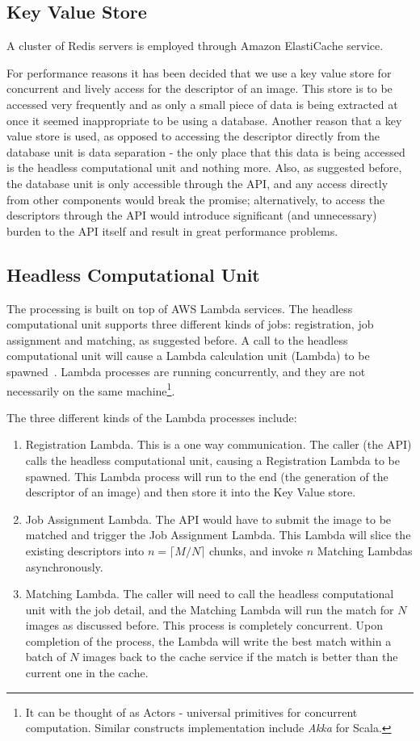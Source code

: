 \subsection{Key Value Store}
A cluster of Redis servers is employed through Amazon ElastiCache service.

For performance reasons it has been decided that we use a key value store for concurrent and lively access for the descriptor of an image. This store is to be accessed very frequently and as only a small piece of data is being extracted at once it seemed inappropriate to be using a database. Another reason that a key value store is used, as opposed to accessing the descriptor directly from the database unit is data separation - the only place that this data is being accessed is the headless computational unit and nothing more. Also, as suggested before, the database unit is only accessible through the API, and any access directly from other components would break the promise; alternatively, to access the descriptors through the API would introduce significant (and unnecessary) burden to the API itself and result in great performance problems.

\subsection{Headless Computational Unit}
\label{sec:lambda}
The processing is built on top of AWS Lambda services. The headless computational unit supports three different kinds of jobs: registration, job assignment and matching, as suggested before. A call to the headless computational unit will cause a Lambda calculation unit (Lambda) to be spawned~\cite{lambda}. Lambda processes are running concurrently, and they are not necessarily on the same machine\footnote{It can be thought of as Actors - universal primitives for concurrent computation. Similar constructs implementation include \textit{Akka} for Scala.}.

The three different kinds of the Lambda processes include:

\begin{enumerate}
	\item Registration Lambda. This is a one way communication. The caller (the API) calls the headless computational unit, causing a Registration Lambda to be spawned. This Lambda process will run to the end (the generation of the descriptor of an image) and then store it into the Key Value store.
	\item Job Assignment Lambda. The API would have to submit the image to be matched and trigger the Job Assignment Lambda. This Lambda will slice the existing descriptors into $n=\lceil M / N \rceil$ chunks, and invoke $n$ Matching Lambdas asynchronously.
	\item Matching Lambda. The caller will need to call the headless computational unit with the job detail, and the Matching Lambda will run the match for $N$ images as discussed before. This process is completely concurrent. Upon completion of the process, the Lambda will write the best match within a batch of $N$ images back to the cache service if the match is better than the current one in the cache.
\end{enumerate}

